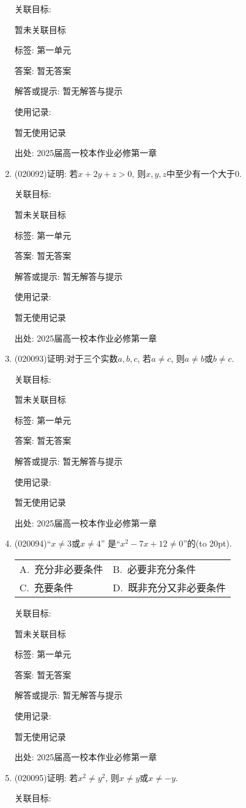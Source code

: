 \documentclass[10pt,a4paper]{article}
\newcommand{\bracket}[1]{(\hbox to #1pt{})}
\newcommand{\twoch}[4]{\par\begin{tabular}{p{.46\textwidth}p{.46\textwidth}}
A.~#1& B.~#2\\
C.~#3& D.~#4
\end{tabular}}
\begin{document}
\begin{enumerate}[1.]
关联目标:

暂未关联目标



标签: 第一单元

答案: 暂无答案

解答或提示: 暂无解答与提示

使用记录:

暂无使用记录


出处: 2025届高一校本作业必修第一章
\item { (020092)}证明: 若$x+2y+z>0$, 则$x,y,z$中至少有一个大于$0$.


关联目标:

暂未关联目标



标签: 第一单元

答案: 暂无答案

解答或提示: 暂无解答与提示

使用记录:

暂无使用记录


出处: 2025届高一校本作业必修第一章
\item { (020093)}证明:对于三个实数$a,b,c$, 若$a\ne c$, 则$a\ne b$或$b\ne c$.


关联目标:

暂未关联目标



标签: 第一单元

答案: 暂无答案

解答或提示: 暂无解答与提示

使用记录:

暂无使用记录


出处: 2025届高一校本作业必修第一章
\item { (020094)}``$x\ne 3$或$x\ne 4$'' 是``$x^2-7x+12\ne 0$''的\bracket{20}.
\twoch{充分非必要条件}{必要非充分条件}{充要条件}{既非充分又非必要条件}


关联目标:

暂未关联目标



标签: 第一单元

答案: 暂无答案

解答或提示: 暂无解答与提示

使用记录:

暂无使用记录


出处: 2025届高一校本作业必修第一章
\item { (020095)}证明: 若$x^2\ne y^2$, 则$x\ne y$或$x\ne -y$.


关联目标:


\end{enumerate}
\end{document}
